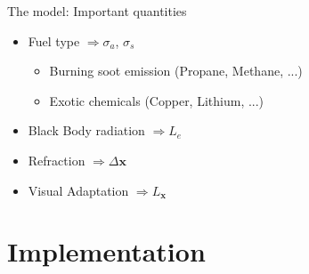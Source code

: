 \documentclass{beamer}
\newcommand{\x}{\mathbf{x}}
\begin{document}
\begin{frame}{The model: Important quantities}

\begin{itemize}
\setlength\itemsep{0.5em}
\item Fuel type $\Rightarrow \sigma_a$, $\sigma_s$
	\begin{itemize}
	\setlength\itemsep{0.5em}
	\item Burning soot emission (Propane, Methane, ...)
	\item Exotic chemicals (Copper, Lithium, ...)
	\end{itemize}
\item Black Body radiation $\Rightarrow L_e$
\item Refraction $\Rightarrow \Delta\x$
\item Visual Adaptation $\Rightarrow L_{\x}$
\end{itemize}

\end{frame}

\section{Implementation}
\subsection{ }
\end{document}
